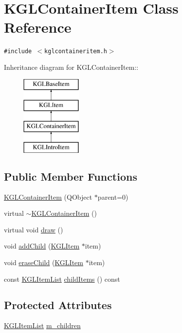 \hypertarget{class_k_g_l_container_item}{
\section{KGLContainerItem Class Reference}
\label{class_k_g_l_container_item}
}
{\tt \#include $<$kglcontaineritem.h$>$}

Inheritance diagram for KGLContainerItem::\begin{figure}[H]
\begin{center}
\leavevmode
\includegraphics[height=4cm]{class_k_g_l_container_item}
\end{center}
\end{figure}
\subsection*{Public Member Functions}
\begin{CompactItemize}
\item 
\hyperlink{class_k_g_l_container_item_528a22298dba0b7d924d815021974f21}{KGLContainerItem} (QObject $\ast$parent=0)
\item 
virtual \hyperlink{class_k_g_l_container_item_3423869f556bf2b5949fe49c91e6d2f0}{$\sim$KGLContainerItem} ()
\item 
virtual void \hyperlink{class_k_g_l_container_item_a785dc67935db5f335c74e4a7fb685b9}{draw} ()
\item 
void \hyperlink{class_k_g_l_container_item_1fb6362381fbdd8270b02d66d5b02181}{addChild} (\hyperlink{class_k_g_l_item}{KGLItem} $\ast$item)
\item 
void \hyperlink{class_k_g_l_container_item_a95f051ed6ff3c4603023a3edf48d1e9}{eraseChild} (\hyperlink{class_k_g_l_item}{KGLItem} $\ast$item)
\item 
const \hyperlink{class_k_g_l_item_list}{KGLItemList} \hyperlink{class_k_g_l_container_item_3ade56aba64c289d67dfb1762c161182}{childItems} () const 
\end{CompactItemize}
\subsection*{Protected Attributes}
\begin{CompactItemize}
\item 
\hyperlink{class_k_g_l_item_list}{KGLItemList} \hyperlink{class_k_g_l_container_item_1bfbe0d002c10f18687b3bd59b97f6d3}{m\_\-children}
\end{CompactItemize}


